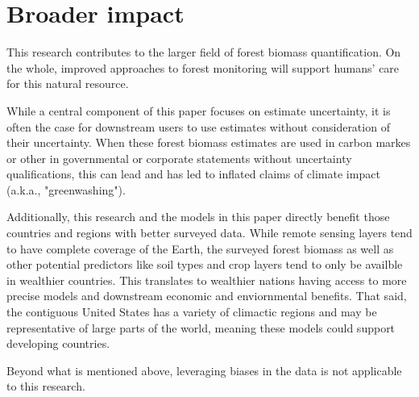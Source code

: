 \documentclass{article}
\begin{document}
\section*{Broader impact}

This research contributes to the larger field of forest biomass quantification. On the whole, improved approaches to forest monitoring will support humans' care for this natural resource. 

While a central component of this paper focuses on estimate uncertainty, it is often the case for downstream users to use estimates without consideration of their uncertainty. When these forest biomass estimates are used in carbon markes or other in governmental or corporate statements without uncertainty qualifications, this can lead and has led to inflated claims of climate impact (a.k.a., "greenwashing").

Additionally, this research and the models in this paper directly benefit those countries and regions with better surveyed data. While remote sensing layers tend to have complete coverage of the Earth, the surveyed forest biomass as well as other potential predictors like soil types and crop layers tend to only be availble in wealthier countries. This translates to wealthier nations having access to more precise models and downstream economic and enviornmental benefits. That said, the contiguous United States has a variety of climactic regions and may be representative of large parts of the world, meaning these models could support developing countries. 

Beyond what is mentioned above, leveraging biases in the data is not applicable to this research. 

{\small


}
\end{document}
